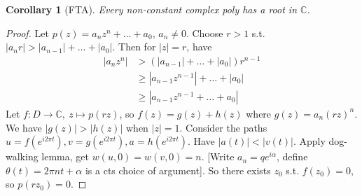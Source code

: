 \documentclass{article}
\theoremstyle{definition}
\theoremstyle{remark}
\theoremstyle{plain}
\newtheorem{crly}[defn]{Corollary}
\newcommand{\CC}{\mathbb{C}}
\begin{document}
\begin{crly}[FTA]
    Every non-constant complex poly has a root in $\CC$.
\end{crly}
\begin{proof}
    Let $p(z)=a_nz^n+\ldots+a_0$, $a_n\neq 0$. Choose $r>1$ s.t. $|a_nr|>|a_{n-1}|+\ldots+|a_0|$. Then for $|z|=r$, have
    \begin{align*}
        |a_nz^n|&> (|a_{n-1}|+\ldots+|a_0|)r^{n-1}\\
        &\ge |a_{n-1}z^{n-1}|+\ldots+|a_0|\\
        &\ge |a_{n-1}z^{n-1}+\ldots+a_0|
    \end{align*}
    Let $f:D\to\CC,\ z\mapsto p(rz)$, so $f(z)=g(z)+h(z)$ where $g(z)=a_n(rz)^n$. We have $|g(z)|>|h(z)|$ when $|z|=1$. Consider the paths $u=f(e^{i2\pi t}), v=g(e^{i2\pi t}), a=h(e^{i2\pi t})$. Have $|a(t)|<|v(t)|$. Apply dog-walking lemma, get $w(u,0)=w(v,0)=n$. [Write $a_n=qe^{i\alpha}$, define $\theta(t)=2\pi nt+\alpha$ is a cts choice of argument]. So there exists $z_0$ s.t. $f(z_0)=0$, so $p(rz_0)=0$.
\end{proof}
\end{document}
